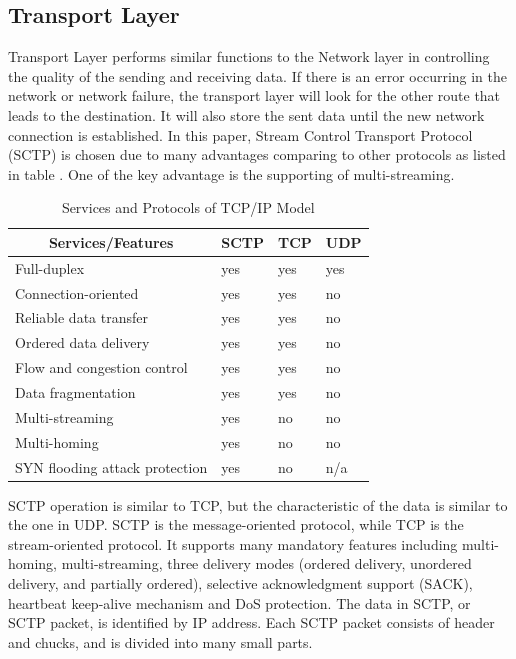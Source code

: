 \documentclass[conference]{IEEEtran}
\begin{document}
\subsection{Transport Layer}
Transport Layer performs similar functions to the Network layer in controlling the quality of the sending and receiving data. 
If there is an error occurring in the network or network failure, the transport layer will look for the other route that leads to the destination. 
It will also store the sent data until the new network connection is established. 
In this paper, Stream Control Transport Protocol (SCTP) is chosen due to many advantages comparing to other protocols as listed in table . 
One of the key advantage is the supporting of multi-streaming. 

\begin{table}[h]
  \renewcommand{\arraystretch}{2}
  \renewcommand{\tabcolsep}{2mm}
  \centering
  \begin{tabularx}{0.5\textwidth}{|p{4.4cm}|p{1cm}|p{1cm}|p{1cm}|}
    \hline
    \multicolumn{1}{|c|}{\textbf{Services/Features}} &  
    \multicolumn{1}{c|}{\textbf{SCTP}} &
    \multicolumn{1}{c|}{\textbf{TCP}} &
    \multicolumn{1}{c|}{\textbf{UDP}} \\ \hline
    Full-duplex &  yes & yes & yes \\ \hline 
    Connection-oriented & yes & yes & no \\ \hline 
    Reliable data transfer & yes & yes & no \\ \hline 
    Ordered data delivery & yes & yes & no \\ \hline 
    Flow and congestion control & yes & yes & no \\ \hline
    Data fragmentation & yes & yes & no \\ \hline
    Multi-streaming & yes & no & no \\ \hline
    Multi-homing & yes & no & no \\ \hline
    SYN flooding attack protection & yes & no & n/a  \\ \hline
  \end{tabularx}
  \space
  \caption{Services and Protocols of TCP/IP Model}
  \label{tab:1}
\end{table}

SCTP operation is similar to TCP, but the characteristic of the data is similar to the one in UDP. 
SCTP is the message-oriented protocol, while TCP is the stream-oriented protocol. 
It supports many mandatory features including multi-homing, multi-streaming, three delivery modes (ordered delivery, unordered delivery, and partially ordered), selective acknowledgment support (SACK), heartbeat keep-alive mechanism and DoS protection. 
The data in SCTP, or SCTP packet, is identified by IP address. 
Each SCTP packet consists of header and chucks, and is divided into many small parts. 
\end{document}
